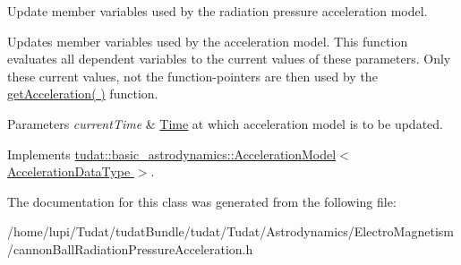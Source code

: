 Update member variables used by the radiation pressure acceleration model. 

Updates member variables used by the acceleration model. This function evaluates all dependent variables to the \textquotesingle{}current\textquotesingle{} values of these parameters. Only these current values, not the function-\/pointers are then used by the \hyperlink{classtudat_1_1electro__magnetism_1_1CannonBallRadiationPressureAcceleration_a4fb5ecf9b9b5f3c1170df2a1f3a62043}{get\+Acceleration( )} function. 
\begin{DoxyParams}{Parameters}
{\em current\+Time} & \hyperlink{classtudat_1_1Time}{Time} at which acceleration model is to be updated. \\
\hline
\end{DoxyParams}


Implements \hyperlink{classtudat_1_1basic__astrodynamics_1_1AccelerationModel_a966e85b72300b8cbc99ba60e40108d71}{tudat\+::basic\+\_\+astrodynamics\+::\+Acceleration\+Model$<$ Acceleration\+Data\+Type $>$}.



The documentation for this class was generated from the following file\+:\begin{DoxyCompactItemize}
\item 
/home/lupi/\+Tudat/tudat\+Bundle/tudat/\+Tudat/\+Astrodynamics/\+Electro\+Magnetism/cannon\+Ball\+Radiation\+Pressure\+Acceleration.\+h\end{DoxyCompactItemize}
